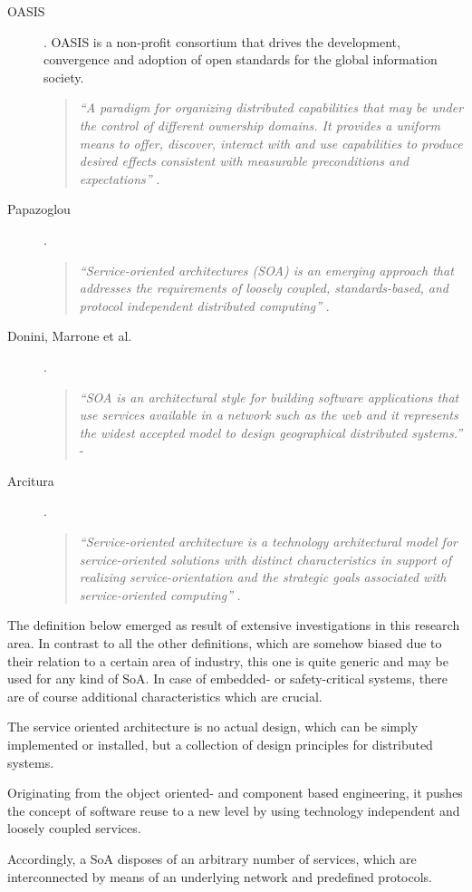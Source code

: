 \begin{description}
	\item [OASIS].
	OASIS is a non-profit consortium that drives the development, convergence and adoption of open standards for the global information society.
	\begin{quote}
	\emph{``A paradigm for organizing distributed capabilities that may be under the control of different ownership domains. It provides a uniform means to offer, discover, interact with and use capabilities to produce desired effects consistent with measurable preconditions and expectations''} \cite{oasis2006}.
	\end{quote}

	\item [Papazoglou].
	\begin{quote}
	\emph{``Service-oriented architectures (SOA) is an emerging approach that addresses the requirements of loosely coupled, standards-based, and protocol independent distributed computing''} \cite{papazoglou2007}.
	\end{quote}

	\item [Donini, Marrone et al.].
	\begin{quote}
	\emph{``SOA is an architectural style for building software applications that use services available in a network such as the web and it represents the widest accepted model to design geographical distributed systems.''} - \cite{donini2008}
	\end{quote}

	\item [Arcitura].
	\begin{quote}
	\emph{``Service-oriented architecture is a technology architectural model for service-oriented solutions with distinct characteristics in support of realizing service-orientation and the strategic goals associated with service-oriented computing''} \cite{arcitura}.
	\end{quote}
\end{description}

The definition below emerged as result of extensive investigations in this research area. In contrast to all the other definitions, which are somehow biased due to their relation to a certain area of industry, this one is quite generic and may be used for any kind of SoA. In case of embedded- or safety-critical systems, there are of course additional characteristics which are crucial.

\begin{myquote}
	The service oriented architecture is no actual design, which can be simply implemented or installed, but a collection of design principles for distributed systems.

	Originating from the object oriented- and component based engineering, it pushes the concept of software reuse to a new level by using technology independent and loosely coupled services.

	Accordingly, a SoA disposes of an arbitrary number of services, which are interconnected by means of an underlying network and predefined protocols.
\end{myquote}

